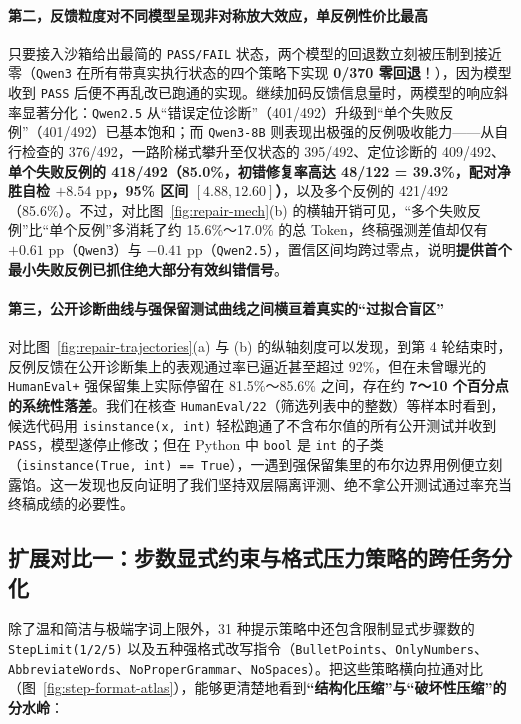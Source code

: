 \paragraph{第二，反馈粒度对不同模型呈现非对称放大效应，单反例性价比最高}只要接入沙箱给出最简的 \texttt{PASS/FAIL} 状态，两个模型的回退数立刻被压制到接近零（\texttt{Qwen3} 在所有带真实执行状态的四个策略下实现 \textbf{0/370 零回退}！），因为模型收到 \texttt{PASS} 后便不再乱改已跑通的实现。继续加码反馈信息量时，两模型的响应斜率显著分化：\texttt{Qwen2.5} 从“错误定位诊断”（401/492）升级到“单个失败反例”（401/492）已基本饱和；而 \texttt{Qwen3-8B} 则表现出极强的反例吸收能力——从自行检查的 376/492，一路阶梯式攀升至仅状态的 395/492、定位诊断的 409/492、\textbf{单个失败反例的 418/492（85.0\%，初错修复率高达 48/122 = 39.3\%，配对净胜自检 $+8.54\text{ pp}$，95\% 区间 $[4.88, 12.60]$）}，以及多个反例的 421/492（85.6\%）。不过，对比图~\ref{fig:repair-mech}(b) 的横轴开销可见，“多个失败反例”比“单个反例”多消耗了约 15.6\%～17.0\% 的总 Token，终稿强测差值却仅有 $+0.61\text{ pp}$（\texttt{Qwen3}）与 $-0.41\text{ pp}$（\texttt{Qwen2.5}），置信区间均跨过零点，说明\textbf{提供首个最小失败反例已抓住绝大部分有效纠错信号}。

\paragraph{第三，公开诊断曲线与强保留测试曲线之间横亘着真实的“过拟合盲区”}对比图~\ref{fig:repair-trajectories}(a) 与 (b) 的纵轴刻度可以发现，到第 4 轮结束时，反例反馈在公开诊断集上的表观通过率已逼近甚至超过 92\%，但在未曾曝光的 \texttt{HumanEval+} 强保留集上实际停留在 81.5\%～85.6\% 之间，存在约 \textbf{7～10 个百分点的系统性落差}。我们在核查 \texttt{HumanEval/22}（筛选列表中的整数）等样本时看到，候选代码用 \texttt{isinstance(x, int)} 轻松跑通了不含布尔值的所有公开测试并收到 \texttt{PASS}，模型遂停止修改；但在 Python 中 \texttt{bool} 是 \texttt{int} 的子类（\texttt{isinstance(True, int) == True}），一遇到强保留集里的布尔边界用例便立刻露馅。这一发现也反向证明了我们坚持双层隔离评测、绝不拿公开测试通过率充当终稿成绩的必要性。

\subsection{扩展对比一：步数显式约束与格式压力策略的跨任务分化}

除了温和简洁与极端字词上限外，31 种提示策略中还包含限制显式步骤数的 \texttt{StepLimit(1/2/5)} 以及五种强格式改写指令（\texttt{BulletPoints}、\texttt{OnlyNumbers}、\texttt{AbbreviateWords}、\texttt{NoProperGrammar}、\texttt{NoSpaces}）。把这些策略横向拉通对比（图~\ref{fig:step-format-atlas}），能够更清楚地看到\textbf{“结构化压缩”与“破坏性压缩”的分水岭}：


